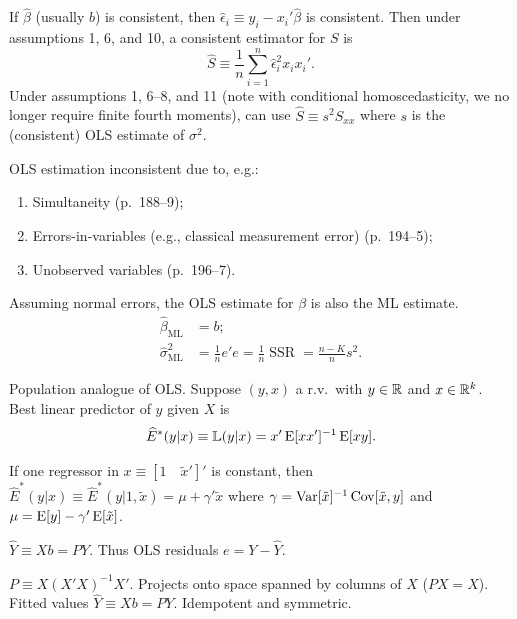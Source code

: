 \documentclass[8pt,letterpaper, landscape]{extarticle} %
\begin{document}
\begin{multicols}{3}
\begin{description}
 If $ \hat{\beta} $ (usually $ b $) is consistent, then $ \hat{\epsilon}_i \equiv y_i - x_{i}' \hat{\beta}  $ is consistent. Then under assumptions 1, 6, and 10, a consistent estimator for $ S $ is
$$ \widehat{S} \equiv \frac{1}{n} \sum_{i = 1}^{n} \hat{\epsilon}_{i}^{2} x_i x_{i}' . $$
Under assumptions 1, 6--8, and 11 (note with conditional homoscedasticity, we no longer require finite fourth moments), can use $ \widehat{S} \equiv s^{2} S_{xx} $ where $ s $ is the (consistent) OLS estimate of $ \sigma^2 $.

 OLS estimation inconsistent due to, e.g.:
\begin{enumerate}
\item Simultaneity (p.~188--9);
\item Errors-in-variables (e.g., classical measurement error) (p.~194--5);
\item Unobserved variables (p.~196--7).
\end{enumerate}

 Assuming normal errors, the OLS estimate for $ \beta $ is also the ML estimate.
\begin{align*}
\hat{\beta}_{\operatorname{ML}} &= b; \\
\hat{\sigma}^2_{\operatorname{ML}} &= \tfrac{1}{n} e' e = \tfrac{1}{n} \operatorname{SSR} = \tfrac{n-K}{n} s^2 .
\end{align*}

 Population analogue of OLS. Suppose $ (y, x) $ a r.v.\ with $ y \in \mathbb{R} $ and $ x \in \mathbb{R}^k $. Best linear predictor of $ y $ given $ X $ is $$ \widehat{E}^*(y|x) \equiv \mathbb{L} (y|x) = x' \operatorname{E} [xx']^{-1} \operatorname{E} [xy] . $$

If one regressor in $ x \equiv [1 \quad \tilde{x}' ]' $ is constant, then $ \widehat{E}^{*} (y|x) \equiv \widehat{E}^{*} (y|1, \tilde{x}) = \mu + \gamma' \tilde{x} $ where $ \gamma = \operatorname{Var} [\tilde{x}]^{-1} \operatorname{Cov} [\tilde{x}, y] $ and $ \mu = \operatorname{E} [y] - \gamma' \operatorname{E}[\tilde{x}] $.

 $ \widehat{Y} \equiv X b = P Y $. Thus OLS residuals $ e = Y - \widehat{Y} $.

 $ P \equiv X (X' X)^{-1} X' $. Projects onto space spanned by columns of $ X $ ($ PX = X $). Fitted values $ \widehat{Y} \equiv Xb = PY $. Idempotent and symmetric.


\end{description}
\end{multicols}
\end{document}
